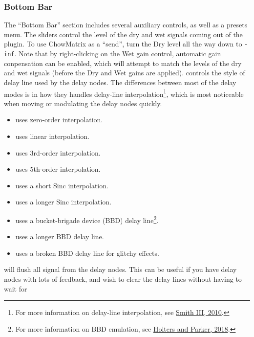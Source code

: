 \documentclass[landscape,twocolumn,a5paper]{manual}
\begin{document}
\subsubsection{Bottom Bar}
The ``Bottom Bar'' section includes several auxiliary controls,
as well as a presets menu.
\newpar
The  sliders control the level of the dry
and wet signals coming out of the plugin. To use ChowMatrix as
a ``send'', turn the Dry level all the way down to \texttt{-inf}.
Note that by right-clicking on the Wet gain control, automatic gain
conpensation can be enabled, which will attempt to match the levels
of the dry and wet signals (before the Dry and Wet gains are applied).
\newpar
\hypertarget{goto:interp-mode}{} controls
the style of delay line used by the delay nodes. The
differences between most of the delay modes is in how they
handles delay-line interpolation\footnote{For more information on
delay-line interpolation, see \href{https://ccrma.stanford.edu/~jos/pasp/Delay_Line_Signal_Interpolation.html}{Smith III, 2010}.},
which is most noticeable when moving or modulating the delay
nodes quickly.
\vspace{-0.5em}
\begin{itemize}
    \itemsep-1mm
    \item {} uses zero-order interpolation.
    \item {} uses linear interpolation.
    \item {} uses 3rd-order interpolation.
    \item {} uses 5th-order interpolation.
    \item {} uses a short Sinc interpolation.
    \item {} uses a longer Sinc interpolation.
    \item {} uses a bucket-brigade device (BBD)
          delay line\footnote{For more information on BBD emulation, see
          \href{https://www.dafx.de/paper-archive/2018/papers/DAFx2018_paper_12.pdf}{Holters and Parker, 2018}.}.
    \item {} uses a longer BBD delay line.
    \item {} uses a broken BBD delay line for glitchy effects.
\end{itemize}
%
 will flush all signal from the delay nodes.
This can be useful if you have delay nodes with lots of feedback,
and wish to clear the delay lines without having to wait for
\end{document}
